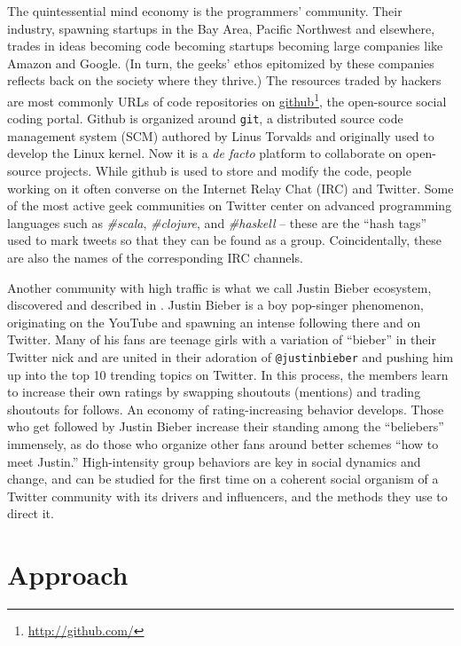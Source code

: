 \documentclass[10pt,oneside]{memoir}
\begin{document}
\begin{Spacing}{2}
The quintessential mind economy is the programmers' community. Their industry, spawning startups in the Bay Area, Pacific Northwest and elsewhere, trades in ideas becoming code becoming startups becoming large companies like Amazon and Google. (In turn, the geeks' ethos epitomized by these companies reflects back on the society where they thrive.) The resources traded by hackers are most commonly URLs of code repositories on \href{http://github.com/}{github}\footnote{\href{http://github.com/}{http://github.com/}}, the open-source social coding portal. Github is organized around \texttt{git}, a distributed source code management system (SCM) authored by Linus Torvalds and originally used to develop the Linux kernel. Now it is a {\itshape de facto} platform to collaborate on open-source projects. While github is used to store and modify the code, people working on it often converse on the Internet Relay Chat (IRC) and Twitter. Some of the most active geek communities on Twitter center on advanced programming languages such as {\itshape \#scala}, {\itshape \#clojure}, and {\itshape \#haskell} -- these are the ``hash tags'' used to mark tweets so that they can be found as a group. Coincidentally, these are also the names of the corresponding IRC channels.


Another community with high traffic is what we call Justin Bieber ecosystem, discovered and described in \cite{Khrabrov:2010:Dynamic}. Justin Bieber is a boy pop-singer phenomenon, originating on the YouTube and spawning an intense following there and on Twitter. Many of his fans are teenage girls with a variation of ``bieber'' in their Twitter nick and are united in their adoration of \texttt{@justinbieber} and pushing him up into the top 10 trending topics on Twitter. In this process, the members learn to increase their own ratings by swapping shoutouts (mentions) and trading shoutouts for follows. An economy of rating-increasing behavior develops. Those who get followed by Justin Bieber increase their standing among the ``beliebers'' immensely, as do those who organize other fans around better schemes ``how to meet Justin.'' High-intensity group behaviors are key in social dynamics and change, and can be studied for the first time on a coherent social organism of a Twitter community with its drivers and influencers, and the methods they use to direct it.


\section{Approach}
\label{approach}


\end{Spacing}
\end{document}
